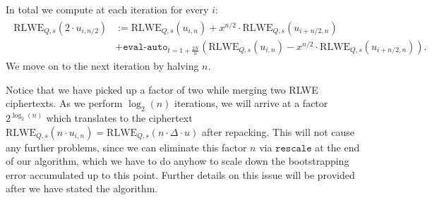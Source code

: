 \documentclass[letterpaper,10pt,english]{jupyterBook}
\begin{document}
\sphinxAtStartPar
In total we compute at each iteration for every \(i\):
\begin{equation*}
\begin{split}\begin{split}
\mathrm{RLWE}_{Q,s}(2\cdot u_{i,n/2}) &:= \mathrm{RLWE}_{Q,s}(u_{i,n}) + x^{n/2} \cdot \mathrm{RLWE}_{Q,s}(u_{i+n/2,n}) \\ &+ \texttt{eval-auto}_{t=1+\frac{2N}{n}}\left( \mathrm{RLWE}_{Q,s}(u_{i,n}) - x^{n/2} \cdot \mathrm{RLWE}_{Q,s}(u_{i+n/2,n})\right).
\end{split}\end{split}
\end{equation*}
\sphinxAtStartPar
We move on to the next iteration by halving \(n\).

\sphinxAtStartPar
Notice that we have picked up a factor of two while merging two RLWE ciphertexts.
As we perform \(\log_2(n)\) iterations, we will arrive at a factor \(2^{\log_2(n)}\) which translates to the ciphertext \(\mathrm{RLWE}_{Q,s}(n\cdot u_{i,n}) = \mathrm{RLWE}_{Q,s}(n\cdot \Delta \cdot u)\) after repacking.
This will not cause any further problems, since we can eliminate this factor \(n\) via \(\texttt{rescale}\) at the end of our algorithm, which we have to do anyhow to scale down the bootstrapping error accumulated up to this point.
Further details on this issue will be provided after we have stated the algorithm.
\end{document}

